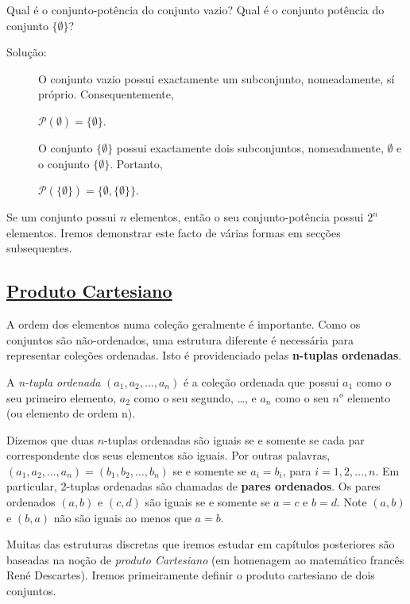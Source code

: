 \begin{exmp}
\label{exem312}
Qual é o conjunto-potência do conjunto vazio? Qual é o conjunto potência do
conjunto $\{\emptyset\}$?
\begin{description}
\item[Solução:]O conjunto vazio possui exactamente um subconjunto, nomeadamente,
sí próprio. Consequentemente,
\begin{center}
$\mathcal{P}(\emptyset) = \{\emptyset\}$.
\end{center}
O conjunto $\{\emptyset\}$ possui exactamente dois subconjuntos, nomeadamente,
$\emptyset$ e o conjunto $\{\emptyset\}$. Portanto,
\begin{center}
$\mathcal{P}(\{\emptyset\}) = \{\emptyset, \{\emptyset\}\}$.
\end{center}
\end{description}
\end{exmp}
Se um conjunto possui $n$ elementos, então o seu conjunto-potência possui $2^n$
elementos. Iremos demonstrar este facto de várias formas em secções
subsequentes.

\subsection*{\underline{Produto Cartesiano}}

A ordem dos elementos numa coleção geralmente é importante. Como os conjuntos
são não-ordenados, uma estrutura diferente é necessária para representar
coleções ordenadas. Isto é providenciado pelas \textbf{n-tuplas ordenadas}.

\begin{defn}
\label{def37}
A \emph{n-tupla ordenada} $(a_1, a_2, \ldots, a_n)$ é a coleção ordenada que
possui $a_1$ como o seu primeiro elemento, $a_2$ como o seu segundo, \ldots, e
$a_n$ como o seu $n^o$ elemento (ou elemento de ordem n).
\end{defn} 

Dizemos que duas $n$-tuplas ordenadas são iguais se e somente se cada par
correspondente dos seus elementos são iguais. Por outras palavras, $(a_1, a_2,
\ldots,a_n) = (b_1, b_2, \ldots, b_n)$ se e somente se $a_i = b_i$, para
$i=1,2,\ldots,n$. Em particular, 2-tuplas ordenadas são chamadas de
\textbf{pares ordenados}. Os pares ordenados $(a,b)$ e $(c,d)$ são iguais se e
somente se $a = c$ e $b = d$. Note $(a, b)$  e $(b,a)$ não são iguais ao menos
que $a = b$.

Muitas das estruturas discretas que iremos estudar em capítulos posteriores são
baseadas na noção de \emph{produto Cartesiano} (em homenagem ao matemático
francês René Descartes). Iremos primeiramente definir o produto cartesiano de
dois conjuntos.


